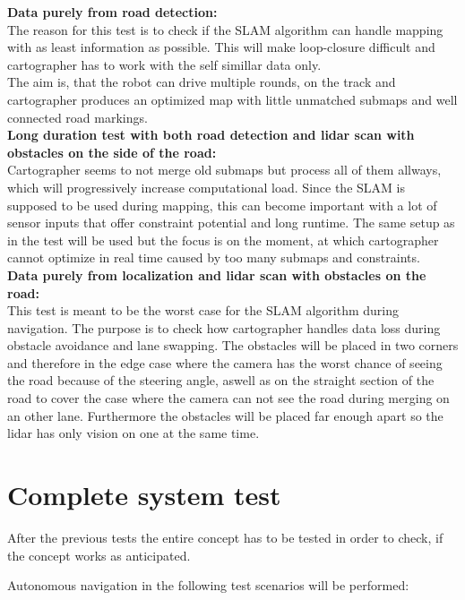 \textbf{Data purely from road detection:}\\
The reason for this test is to check if the SLAM algorithm can handle mapping with as least information as possible. This will make loop-closure difficult and cartographer has to work with the self simillar data only.\\
The aim is, that the robot can drive multiple rounds, on the track and cartographer produces an optimized map with little unmatched submaps and well connected road markings.\\

\textbf{Long duration test with both road detection and lidar scan with obstacles on the side of the road:}\\
Cartographer seems to not merge old submaps but process all of them allways, which will progressively increase computational load. Since the SLAM is supposed to be used during mapping, this can become important with a lot of sensor inputs that offer constraint potential and long runtime.
The same setup as in the  test will be used but the focus is on the moment, at which cartographer cannot optimize in real time caused by too many submaps and constraints.\\


\textbf{Data purely from localization and lidar scan with obstacles on the road:}\\
This test is meant to be the worst case for the SLAM algorithm during navigation. The purpose is to check how cartographer handles data loss during obstacle avoidance and lane swapping.
The obstacles will be placed in two corners and therefore in the edge case where the camera has the worst chance of seeing the road because of the steering angle, aswell as on the straight section of the road to cover the case where the camera can not see the road during merging on an other lane. Furthermore the obstacles will be placed far enough apart so the lidar has only vision on one at the same time.\\


\section{Complete system test}

After the previous tests the entire concept has to be tested in order to check, if the concept works as anticipated.

Autonomous navigation in the following test scenarios will be performed:

